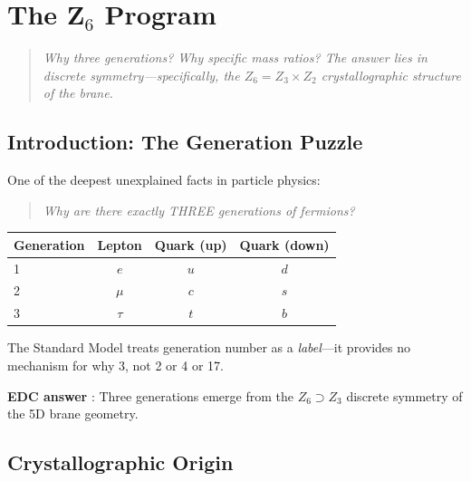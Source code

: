 \chapter{The Z$_6$ Program}
\label{ch:z6_program}

\begin{quote}
\textit{Why three generations? Why specific mass ratios? The answer lies in
discrete symmetry---specifically, the $Z_6 = Z_3 \times Z_2$ crystallographic
structure of the brane.}
\end{quote}

\section{Introduction: The Generation Puzzle}
\label{sec:z6_intro}

One of the deepest unexplained facts in particle physics:

\begin{quote}
\textit{Why are there exactly THREE generations of fermions?}
\end{quote}

\begin{center}
\begin{tabular}{lccc}
\toprule
\textbf{Generation} & \textbf{Lepton} & \textbf{Quark (up)} & \textbf{Quark (down)} \\
\midrule
1 & $e$ & $u$ & $d$ \\
2 & $\mu$ & $c$ & $s$ \\
3 & $\tau$ & $t$ & $b$ \\
\bottomrule
\end{tabular}
\end{center}

The Standard Model treats generation number as a \textit{label}---it
provides no mechanism for why 3, not 2 or 4 or 17.

\textbf{EDC answer} \tagP{}: Three generations emerge from the $Z_6 \supset Z_3$
discrete symmetry of the 5D brane geometry.

\section{Crystallographic Origin}
\label{sec:crystallographic}

